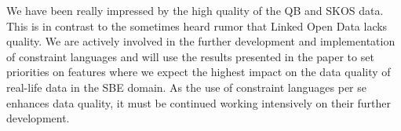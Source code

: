\documentclass[conference]{IEEEtran}
\newcommand{\ke}[1]{\todo[size=\small, color=red!40]{\textbf{Kai:} #1}}
\begin{document}
We have been really impressed by the high quality of the QB and SKOS data. This is in contrast to the sometimes heard rumor that Linked Open Data lacks quality. We are actively involved in the further development and implementation of constraint languages and will use the results presented in the paper to set priorities on features where we expect the highest impact on the data quality of real-life data in the SBE domain.
As the use of constraint languages per se enhances data quality, it must be continued working intensively on their further development.

%
%



%
%
\end{document}
